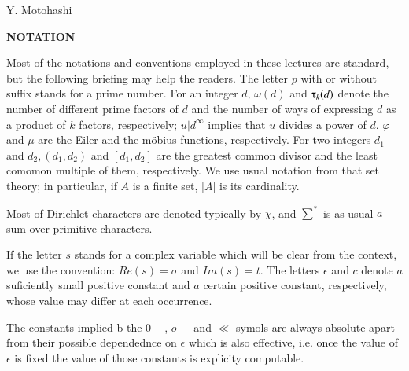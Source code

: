 \vskip 1cm

\hfill Y. Motohashi

\newpage


\thispagestyle{empty}
\begin{center}
 \textbf{NOTATION}
\end{center}


Most of the notations and conventions employed in these lectures are
standard, but the following briefing may help the readers. The letter
$p$ with or without suffix stands for a prime number. For an integer
$d$, $\omega(d)$ and $\tauup_{k} (d)$ denote the number of different
prime factors of $d$ and the number of ways of expressing $d$ as a
product of $k$ factors, respectively; $u|d^{\infty}$ implies that $u$
divides a power of $d$. $\varphi$ and $\mu$ are the Eiler and the
m\"{o}bius functions, respectively. For two integers $d_1$ and $d_2,
(d_1, d_2)$ and $[d_1, d_2]$ are the greatest common divisor and the
least comomon multiple of them, respectively. We use usual notation
from that set theory; in particular, if $A$ is a finite set, $|A|$ is
its cardinality. 

Most of Dirichlet characters are denoted typically by $\chi$, and
$\sum^{*}$ is as usual $a$ sum over primitive characters. 
 
If the letter $s$ stands for a complex variable which will be clear
from the context, we use the convention: $Re(s) =\sigma$ and $Im(s) =
t$. The letters $\epsilon $ and $c$ denote $a$ suficiently small
positive constant and $a$ certain positive constant, respectively,
whose value may differ at each occurrence. 
  
The constants implied b the $0-$, $o-$ and $\ll$ symols are always
absolute apart from their possible dependednce on $\epsilon $ which
is also effective, i.e. once the value of $\epsilon $ is fixed the
value of those constants is explicity computable. 
\thispagestyle{empty}

